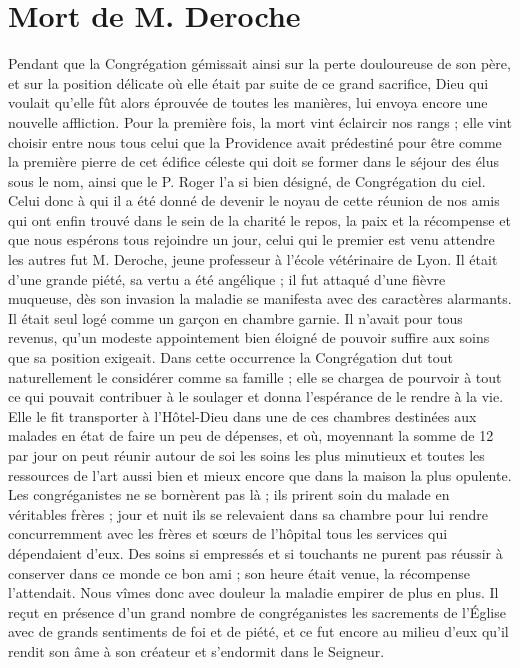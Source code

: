 \section*{Mort de M. Deroche}
Pendant que la Congrégation gémissait ainsi sur la perte douloureuse de son père, et sur la position délicate où elle était par suite de ce grand sacrifice, Dieu qui voulait qu'elle fût alors éprouvée de toutes les manières, lui envoya encore une nouvelle affliction. Pour la première fois, la mort vint éclaircir nos rangs ; elle vint choisir entre nous tous celui que la Providence avait prédestiné pour être comme la première pierre de cet édifice céleste qui doit se former dans le séjour des élus sous le nom, ainsi que le P. Roger l'a si bien désigné, de Congrégation du ciel. Celui donc à qui il a été donné de devenir le noyau de cette réunion de nos amis qui ont enfin trouvé dans le sein de la charité le repos, la paix et la récompense et que nous espérons tous rejoindre un jour, celui qui le premier est venu attendre les autres fut M. Deroche, jeune professeur à l'école vétérinaire de Lyon. Il était d'une grande piété, sa vertu a été angélique ; il fut attaqué d'une fièvre muqueuse, dès son invasion la maladie se manifesta avec des caractères alarmants. Il était seul logé comme un garçon en chambre garnie. Il n'avait pour tous revenus, qu'un modeste appointement bien éloigné de pouvoir suffire aux soins que sa position exigeait. Dans cette occurrence la Congrégation dut tout naturellement le considérer comme sa famille ; elle se chargea de pourvoir à tout ce qui pouvait contribuer à le soulager et donna l'espérance de le rendre à la vie. Elle le fit transporter à l'Hôtel-Dieu dans une de ces
chambres destinées aux malades en état de faire un peu de dépenses, et où, moyennant la somme de 12 par jour on peut réunir autour de soi les soins les plus minutieux et toutes les ressources de l'art aussi bien et mieux encore que dans la maison la plus opulente. Les congréganistes ne se bornèrent pas là ; ils prirent soin du malade en véritables frères ; jour et nuit ils se relevaient dans sa chambre pour lui rendre concurremment avec les frères et sœurs de l'hôpital tous les services qui dépendaient d'eux. Des soins si empressés et si touchants ne purent pas réussir à conserver dans ce monde ce bon ami ; son heure était venue, la récompense l'attendait. Nous vîmes donc avec douleur la maladie empirer de plus en plus. Il reçut en présence d'un grand nombre de congréganistes les sacrements de l'Église avec de grands sentiments de foi et de piété, et ce fut encore au milieu d'eux qu'il rendit son âme à son créateur et s'endormit dans le Seigneur.


